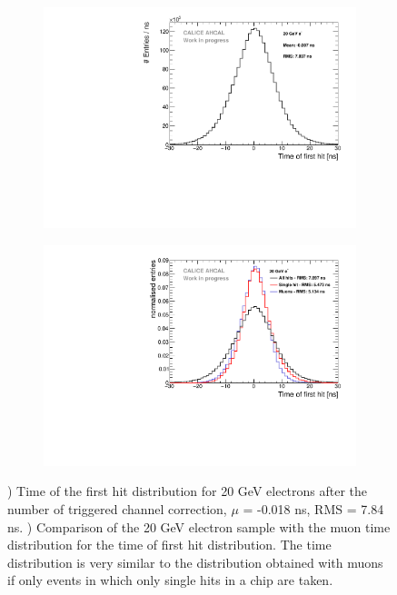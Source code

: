 \begin{figure}[htbp!]
	\begin{subfigure}[t]{0.5\textwidth}
		\centering
		\includegraphics[width=1\textwidth]{../Thesis_Plots/Timing/Electrons/Plots/Timing_AllLayers_20GeV.pdf}
		\caption{}\label{fig:timing_electrons_corr}
	\end{subfigure}
	\hfill
	\begin{subfigure}[t]{0.5\textwidth}
		\centering
		\includegraphics[width=1\textwidth]{../Thesis_Plots/Timing/Electrons/Plots/ComparisonAll_ElectronsSingleHit.pdf}
		\caption{}\label{fig:timing_electron_muon_comp}
	\end{subfigure}
	\caption{) Time of the first hit distribution for 20 GeV electrons after the number of triggered channel correction, $\mu$ = -0.018 ns, RMS = 7.84 ns. ) Comparison of the 20 GeV electron sample with the muon time distribution for the time of first hit distribution. The time distribution is very similar to the distribution obtained with muons if only events in which only single hits in a chip are taken.}
\end{figure}

